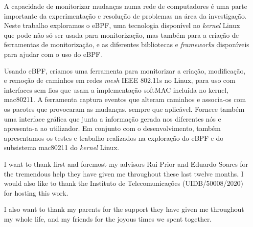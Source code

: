 
A capacidade de monitorizar mudanças numa rede de computadores é uma parte
importante da experimentação e resolução de problemas na área da investigação.
Neste trabalho exploramos o eBPF, uma tecnologia disponível no \textit{kernel}
Linux que pode não só ser usada para monitorização, mas também para a criação de
ferramentas de monitorização, e as diferentes bibliotecas e \textit{frameworks}
disponíveis para ajudar com o uso do eBPF.

Usando eBPF, criamos uma ferramenta para monitorizar a criação, modificação, e
remoção de caminhos em redes \textit{mesh} \ac{IEEE} 802.11s no Linux, para uso
com interfaces sem fios que usam a implementação softMAC incluída no kernel,
mac80211. A ferramenta captura eventos que alteram caminhos e associa-os com os
pacotes que provocaram as mudanças, sempre que aplicável. Fornece também uma
interface gráfica que junta a informação gerada nos diferentes nós e apresenta-a
ao utilizador. Em conjunto com o desenvolvimento, também apresentamos os testes
e trabalho realizados na exploração do eBPF e do subsistema mac80211 do
\textit{kernel} Linux.



I want to thank first and foremost my advisors Rui Prior and Eduardo Soares for
the tremendous help they have given me throughout these last twelve months. I
would also like to thank the Instituto de Telecomunicações (UIDB/50008/2020) for
hosting this work.

I also want to thank my parents for the support they have given me throughout my
whole life, and my friends for the joyous times we spent together.

